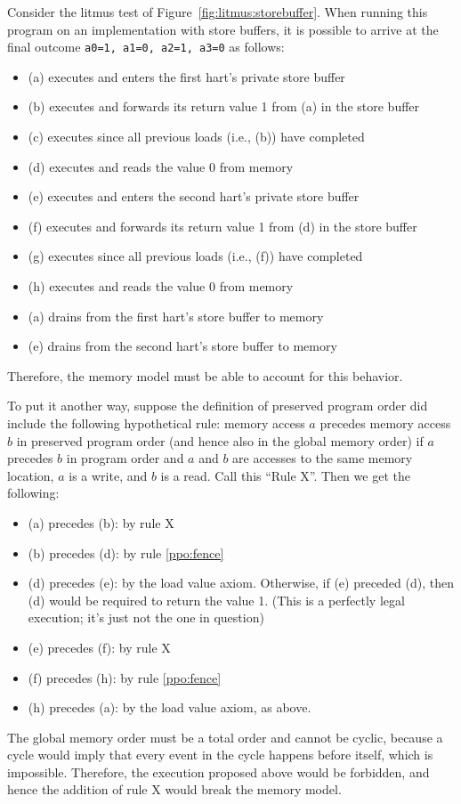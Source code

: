 Consider the litmus test of Figure~\ref{fig:litmus:storebuffer}.
When running this program on an implementation with store buffers, it is possible to arrive at the final outcome
{\tt a0=1, a1=0, a2=1, a3=0}
as follows:
\begin{itemize}
  \item (a) executes and enters the first hart's private store buffer
  \item (b) executes and forwards its return value 1 from (a) in the store buffer
  \item (c) executes since all previous loads (i.e., (b)) have completed
  \item (d) executes and reads the value 0 from memory
  \item (e) executes and enters the second hart's private store buffer
  \item (f) executes and forwards its return value 1 from (d) in the store buffer
  \item (g) executes since all previous loads (i.e., (f)) have completed
  \item (h) executes and reads the value 0 from memory
  \item (a) drains from the first hart's store buffer to memory
  \item (e) drains from the second hart's store buffer to memory
\end{itemize}
Therefore, the memory model must be able to account for this behavior.

To put it another way, suppose the definition of preserved program order did include the following hypothetical rule:
memory access $a$ precedes memory access $b$ in preserved program order (and hence also in the global memory order) if $a$ precedes $b$ in program order and $a$ and $b$ are accesses to the same memory location, $a$ is a write, and $b$ is a read.  Call this ``Rule X''.  Then we get the following:

\begin{itemize}
  \item (a) precedes (b): by rule X
  \item (b) precedes (d): by rule \ref{ppo:fence}
  \item (d) precedes (e): by the load value axiom.  Otherwise, if (e) preceded (d), then (d) would be required to return the value 1.  (This is a perfectly legal execution; it's just not the one in question)
  \item (e) precedes (f): by rule X
  \item (f) precedes (h): by rule \ref{ppo:fence}
  \item (h) precedes (a): by the load value axiom, as above.
\end{itemize}
The global memory order must be a total order and cannot be cyclic, because a cycle would imply that every event in the cycle happens before itself, which is impossible.
Therefore, the execution proposed above would be forbidden, and hence the addition of rule X would break the memory model.


